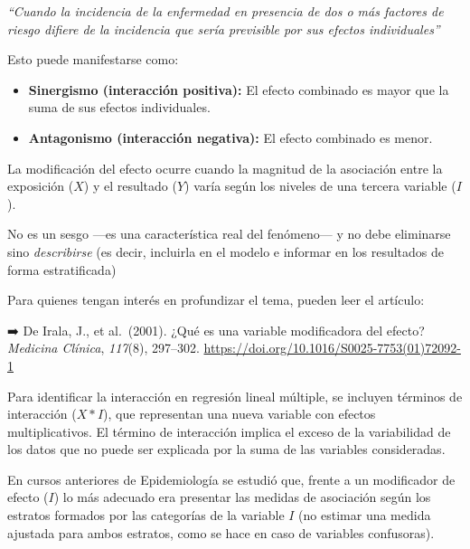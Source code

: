 \documentclass[
  spanish,
  a4paper,
]{scrbook}
\begin{document}
\begin{tcolorbox}[enhanced jigsaw, arc=.35mm, bottomrule=.15mm, breakable, colback=white, colframe=quarto-callout-important-color-frame, left=2mm, leftrule=.75mm, opacityback=0, rightrule=.15mm, toprule=.15mm]
\begin{minipage}[t]{5.5mm}
\textcolor{quarto-callout-important-color}{\faExclamation}
\end{minipage}%
\begin{minipage}[t]{\textwidth - 5.5mm}

\emph{``Cuando la incidencia de la enfermedad en presencia de dos o más
factores de riesgo difiere de la incidencia que sería previsible por sus
efectos individuales''}

\end{minipage}%
\end{tcolorbox}

Esto puede manifestarse como:

\begin{itemize}
\item
  \textbf{Sinergismo (interacción positiva):} El efecto combinado es
  mayor que la suma de sus efectos individuales.
\item
  \textbf{Antagonismo (interacción negativa):} El efecto combinado es
  menor.
\end{itemize}

La modificación del efecto ocurre cuando la magnitud de la asociación
entre la exposición (\(X\)) y el resultado (\(Y\)) varía según los
niveles de una tercera variable (\(I\)).

No es un sesgo ---es una característica real del fenómeno--- y no debe
eliminarse sino \emph{describirse} (es decir, incluirla en el modelo e
informar en los resultados de forma estratificada)

Para quienes tengan interés en profundizar el tema, pueden leer el
artículo:

➡️ De Irala, J., et al.~(2001). ¿Qué es una variable modificadora del
efecto? \emph{Medicina Clínica}, \emph{117}(8), 297--302.
\url{https://doi.org/10.1016/S0025-7753(01)72092-1}

Para identificar la interacción en regresión lineal múltiple, se
incluyen términos de interacción (\(X * I\)), que representan una nueva
variable con efectos multiplicativos. El término de interacción implica
el exceso de la variabilidad de los datos que no puede ser explicada por
la suma de las variables consideradas.

En cursos anteriores de Epidemiología se estudió que, frente a un
modificador de efecto (\(I\)) lo más adecuado era presentar las medidas
de asociación según los estratos formados por las categorías de la
variable \(I\) (no estimar una medida ajustada para ambos estratos, como
se hace en caso de variables confusoras).
\end{document}
